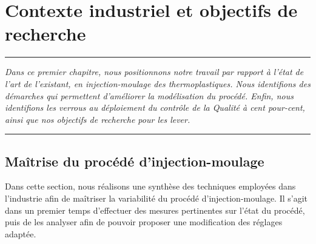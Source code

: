 
\lhead[\fancyplain{}{\leftmark}]%
      {\fancyplain{}{}} %
\chead[\fancyplain{}{}]%
      {\fancyplain{}{}}
\rhead[\fancyplain{}{}]%
      {\fancyplain{}{\rightmark}}%
\lfoot[\fancyplain{}{}]%
      {\fancyplain{}{}}
\cfoot[\fancyplain{}{\thepage}]%
      {\fancyplain{}{\thepage}} %
\rfoot[\fancyplain{}{}]%
     {\fancyplain{}{\scriptsize}}



\chapter{Contexte industriel et objectifs de recherche}
\label{ch:1}


\begin{center}
\rule{0.7\linewidth}{.5pt}
\begin{minipage}{0.7\linewidth}
\smallskip

\textit{Dans ce premier chapitre, nous positionnons notre travail par rapport à l'état de l'art de l'existant, en injection-moulage des thermoplastiques. Nous identifions des démarches qui permettent d'améliorer la modélisation du procédé. Enfin, nous identifions les verrous au déploiement du contrôle de la Qualité à cent pour-cent, ainsi que nos objectifs de recherche pour les lever.
}

\end{minipage}
\smallskip
\rule{0.7\linewidth}{.5pt}
\end{center}

\minitoc
\newpage

\FloatBarrier
\section{Maîtrise du procédé d'injection-moulage}
Dans cette section, nous réalisons une synthèse des techniques employées dans l'industrie afin de maîtriser la variabilité du procédé d'injection-moulage.
Il s'agit dans un premier temps d'effectuer des mesures pertinentes sur l'état du procédé, puis de les analyser afin de pouvoir proposer une modification des réglages adaptée.

